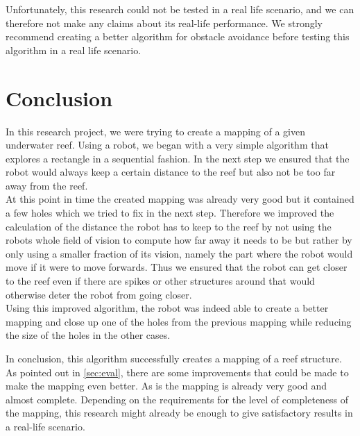 \documentclass[twoside, 12pt]{article}
\begin{document}
Unfortunately, this research could not be tested in a real life scenario, and we can therefore not make any claims about its real-life performance. We strongly recommend creating a better algorithm for obstacle avoidance before testing this algorithm in a real life scenario.\\

\section{Conclusion}
\label{sec:conclusion}

In this research project, we were trying to create a mapping of a given underwater reef. Using a robot, we began with a very simple algorithm that explores a rectangle in a sequential fashion. In the next step we ensured that the robot would always keep a certain distance to the reef but also not be too far away from the reef.\\

At this point in time the created mapping was already very good but it contained a few holes which we tried to fix in the next step. Therefore we improved the calculation of the distance the robot has to keep to the reef by not using the robots whole field of vision to compute how far away it needs to be but rather by only using a smaller fraction of its vision, namely the part where the robot would move if it were to move forwards. Thus we ensured that the robot can get closer to the reef even if there are spikes or other structures around that would otherwise deter the robot from going closer.\\

Using this improved algorithm, the robot was indeed able to create a better mapping and close up one of the holes from the previous mapping while reducing the size of the holes in the other cases.\\


In conclusion, this algorithm successfully creates a mapping of a reef structure. As pointed out in \autoref{sec:eval}, there are some improvements that could be made to make the mapping even better. As is the mapping is already very good and almost complete. Depending on the requirements for the level of completeness of the mapping, this research might already be enough to give satisfactory results in a real-life scenario.\\

\newpage

{}

\end{document}

